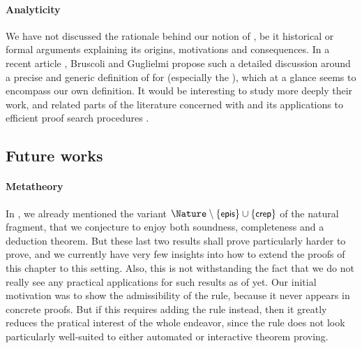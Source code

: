 \paragraph{Analyticity}

We have not discussed the rationale behind our notion of , be it
historical or formal arguments explaining its origins, motivations and
consequences. In a recent article , Bruscoli
and Guglielmi propose such a detailed discussion around a precise and generic
definition of  for   (especially
the ), which at a glance seems to encompass our own
definition. It would be interesting to study more deeply their work, and related
parts of the  literature concerned with  and its
applications to efficient proof search procedures
.

\subsection{Future works}

\paragraph{Metatheory}

In , we already mentioned the variant $\Nature \setminus
\{\rsf{epis}\} \cup \{\rsf{crep}\}$ of the natural fragment, that we conjecture
to enjoy both soundness, completeness and a deduction theorem. But these last
two results shall prove particularly harder to prove, and we currently have very
few insights into how to extend the proofs of this chapter to this setting.
Also, this is not withstanding the fact that we do not really see any practical
applications for such results as of yet. Our initial motivation was to show the
admissibility of the  rule, because it never appears in concrete
proofs. But if this requires adding the  rule instead, then it greatly
reduces the pratical interest of the whole endeavor, since the  rule
does not look particularly well-suited to either automated or interactive
theorem proving.

